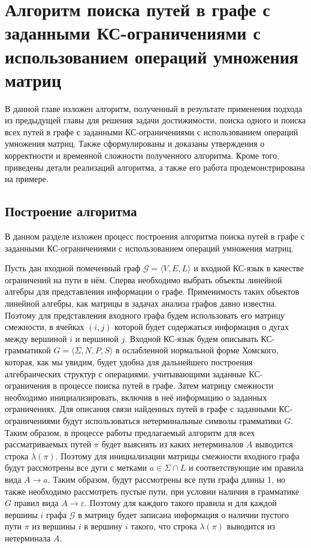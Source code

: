 \chapter{Алгоритм поиска путей в графе с заданными КС-ограничениями с использованием операций умножения матриц}\label{ch:ch3}
В данной главе изложен алгоритм, полученный в результате применения подхода из предыдущей главы для решения задачи достижимости, поиска одного и поиска всех путей в графе с заданными КС-ограничениями с использованием операций умножения матриц. Также сформулированы и доказаны утверждения о корректности и временной сложности полученного алгоритма. Кроме того, приведены детали реализаций алгоритма, а также его работа продемонстрирована на примере.
\section{Построение алгоритма}\label{sec:ch3/sect1}
В данном разделе изложен процесс построения алгоритма поиска путей в графе с заданными КС-ограничениями с использованием операций умножения матриц.

Пусть дан входной помеченный граф $\mathcal{G} = \langle V, E, L\rangle$ и входной КС-язык в качестве ограничений на пути в нём. Сперва необходимо выбрать объекты линейной алгебры для представления информации о графе. Применимость таких объектов линейной алгебры, как матрицы в задачах анализа графов давно известна. Поэтому для представления входного графа будем использовать его матрицу смежности, в ячейках $(i, j)$ которой будет содержаться информация о дугах между вершиной $i$ и вершиной $j$. Входной КС-язык будем описывать КС-грамматикой $G = \langle \Sigma, N, P, S \rangle$ в ослабленной нормальной форме Хомского, которая, как мы увидим, будет удобна для дальнейшего построения алгебраических структур с операциями, учитывающими заданные КС-ограничения в процессе поиска путей в графе. Затем матрицу смежности необходимо инициализировать, включив в неё информацию о заданных ограничениях. Для описания связи найденных путей в графе с заданными КС-ограничениями будут использоваться нетерминальные символы грамматики $G$. Таким образом, в процессе работы предлагаемый алгоритм для всех рассматриваемых путей $\pi$ будет выяснять из каких нетерминалов $A$ выводится строка $\lambda(\pi)$. Поэтому для инициализации матрицы смежности входного графа будут рассмотрены все дуги с метками $a \in \Sigma \cap L$ и соответствующие им правила вида $A \rightarrow a$. Таким образом, будут рассмотрены все пути графа длины 1, но также необходимо рассмотреть пустые пути, при условии наличия в грамматике $G$ правил вида $A \rightarrow \varepsilon$. Поэтому для каждого такого правила и для каждой вершины $i$ графа $\mathcal{G}$ в матрицу будет записана информация о наличии пустого пути $\pi$ из вершины $i$ в вершину $i$ такого, что строка $\lambda(\pi)$ выводится из нетерминала $A$.

